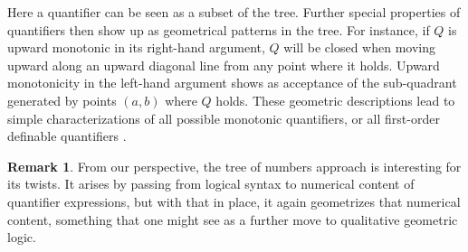 \documentclass[12pt,oneside,reqno]{amsart}
\theoremstyle{definition}
\newtheorem{remark}{Remark}
\begin{document}
Here a quantifier can be seen as a subset of the tree.  Further special properties of quantifiers then show up as geometrical patterns in the tree. For instance, if $Q$  is upward monotonic in its right-hand argument, $Q$ will be closed when moving upward along an upward diagonal line from any point where it holds. Upward monotonicity in the left-hand argument shows as acceptance of the %
sub-quadrant generated by points $(a, b)$ where $Q$ holds. These geometric descriptions lead to simple characterizations of all possible monotonic quantifiers, or all first-order definable quantifiers \citep{vanBenthem1985}.

\begin{remark} From our  perspective, the tree of numbers approach is interesting for its twists. It arises by passing from logical syntax to numerical content of quantifier expressions, but with that in place, it again geometrizes that numerical content, something that one might see as a further move to qualitative  geometric logic.\end{remark}
\end{document}

